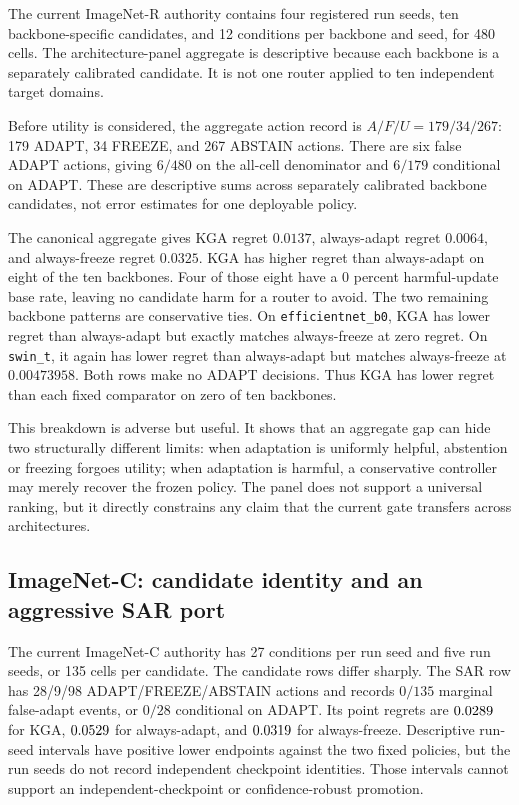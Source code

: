The current ImageNet-R authority contains four registered run seeds, ten backbone-specific
candidates, and 12 conditions per backbone and seed, for 480 cells.  The architecture-panel
aggregate is descriptive because each backbone is a separately calibrated candidate.  It is not
one router applied to ten independent target domains.

Before utility is considered, the aggregate action record is $A/F/U=179/34/267$: 179 ADAPT,
34 FREEZE, and 267 ABSTAIN actions.
There are six false ADAPT actions, giving $6/480$ on the all-cell denominator and $6/179$
conditional on ADAPT.  These are descriptive sums across separately calibrated backbone
candidates, not error estimates for one deployable policy.

The canonical aggregate gives KGA regret $0.0137$, always-adapt regret $0.0064$, and
always-freeze regret $0.0325$.  KGA has higher regret than always-adapt on eight of the ten
backbones.  Four of those eight have a 0 percent harmful-update base rate, leaving no candidate harm
for a router to avoid.  The two remaining backbone patterns are conservative ties.  On
\texttt{efficientnet\_b0}, KGA has lower regret than always-adapt but exactly matches
always-freeze at zero regret.  On \texttt{swin\_t}, it again has lower regret than always-adapt but
matches always-freeze at $0.00473958$.  Both rows make no ADAPT decisions.  Thus KGA has lower
regret than each fixed comparator on zero of ten backbones.

This breakdown is adverse but useful.  It shows that an aggregate gap can hide two structurally
different limits: when adaptation is uniformly helpful, abstention or freezing forgoes utility;
when adaptation is harmful, a conservative controller may merely recover the frozen policy.  The
panel does not support a universal ranking, but it directly constrains any claim that the current
gate transfers across architectures.

\subsection{ImageNet-C: candidate identity and an aggressive SAR port}
\label{fr:sec-imagenetc-dossier}

The current ImageNet-C authority has 27 conditions per run seed and five run seeds, or 135 cells
per candidate.  The candidate rows differ sharply.  The SAR row has 28/9/98 ADAPT/FREEZE/ABSTAIN
actions and records $0/135$ marginal false-adapt events, or $0/28$ conditional on ADAPT.  Its point regrets are $0.0289$ for KGA,
$0.0529$ for always-adapt, and $0.0319$ for always-freeze.  Descriptive run-seed intervals have
positive lower endpoints against the two fixed policies, but the run seeds do not record
independent checkpoint identities.  Those intervals cannot support an independent-checkpoint or
confidence-robust promotion.

